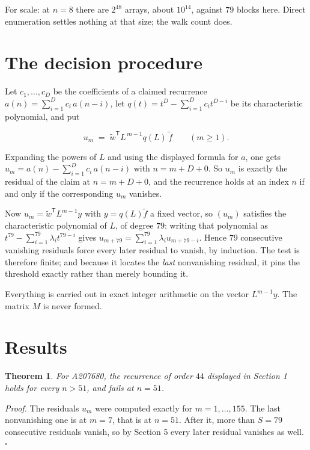 \documentclass[11pt]{article}
\newtheorem{theorem}{Theorem}
\theoremstyle{definition}
\begin{document}
For scale: at $n = 8$ there are $2^{48}$ arrays, about $10^{14}$, against $79$ blocks here. Direct enumeration settles nothing at that size; the walk count does.

\section{The decision procedure}

Let $c_1,\dots,c_D$ be the coefficients of a claimed recurrence $a(n) = \sum_{i=1}^{D} c_i\,a(n-i)$, let $q(t) = t^{D} - \sum_{i=1}^{D} c_i t^{D-i}$ be its characteristic polynomial, and put

\[u_m \;=\; \tilde w^{\mathsf T} L^{\,m-1} q(L)\,\tilde f \qquad (m \ge 1).\]

Expanding the powers of $L$ and using the displayed formula for $a$, one gets $u_m = a(n) - \sum_{i=1}^{D} c_i\,a(n-i)$ with $n = m + D + 0$. So $u_m$ is exactly the residual of the claim at $n = m + D + 0$, and the recurrence holds at an index $n$ if and only if the corresponding $u_m$ vanishes.

Now $u_m = \tilde w^{\mathsf T} L^{m-1} y$ with $y = q(L)\tilde f$ a fixed vector, so $(u_m)$ satisfies the characteristic polynomial of $L$, of degree $79$: writing that polynomial as $t^{79} - \sum_{i=1}^{79} \lambda_i t^{79-i}$ gives $u_{m+79} = \sum_{i=1}^{79} \lambda_i u_{m+79-i}$. Hence $79$ consecutive vanishing residuals force every later residual to vanish, by induction. The test is therefore finite; and because it locates the {\itshape last} nonvanishing residual, it pins the threshold exactly rather than merely bounding it.

Everything is carried out in exact integer arithmetic on the vector $L^{m-1}y$. The matrix $M$ is never formed.

\section{Results}

\begin{theorem} For A207680, the recurrence of order $44$ displayed in Section 1 holds for every $n > 51$, and fails at $n = 51$.\end{theorem}

{\itshape Proof.} The residuals $u_m$ were computed exactly for $m = 1,\dots,155$. The last nonvanishing one is at $m = 7$, that is at $n = 51$. After it, more than $S = 79$ consecutive residuals vanish, so by Section 5 every later residual vanishes as well. $\square$
\end{document}
